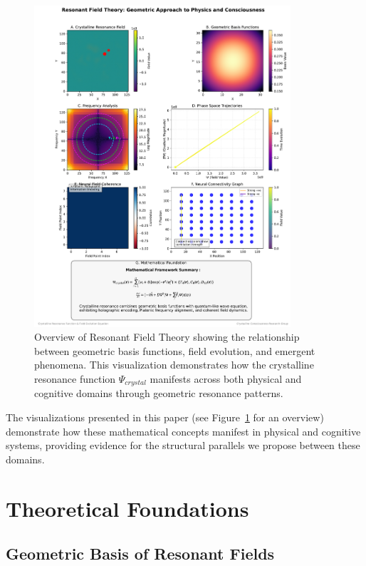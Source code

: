 \documentclass[12pt,letterpaper]{article}
\begin{document}
\begin{figure}[htbp]
    \centering
    \includegraphics[width=0.85\textwidth]{figures/resonant_field_theory_main.pdf}
    \caption{Overview of Resonant Field Theory showing the relationship between geometric basis functions, field evolution, and emergent phenomena. This visualization demonstrates how the crystalline resonance function $\Psi_{crystal}$ manifests across both physical and cognitive domains through geometric resonance patterns.}
    \label{fig:overview}
\end{figure}

The visualizations presented in this paper (see Figure~\ref{fig:overview} for an overview) demonstrate how these mathematical concepts manifest in physical and cognitive systems, providing evidence for the structural parallels we propose between these domains.

\section{Theoretical Foundations}
\label{sec:theoretical_foundations}

\vspace{2mm}
\subsection{Geometric Basis of Resonant Fields}
\label{subsec:geometric_basis}
\end{document}
